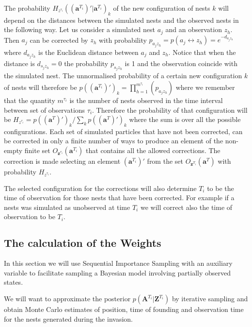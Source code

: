 \documentclass[11pt,a4paper]{article}
\renewcommand{\vec}[1]{\mathbf{#1}}
\begin{document}
{{The probability $H_{z^{\tau_i}}((\vec{a}^{T_i})' | \vec{a}^{T_i})_k$ of the new configuration of nests $k$ will depend on the distances between the simulated nests and the observed nests in the following way. Let us consider a simulated nest $a_j$ and an observation $z_h$. Then $a_j$ can be corrected by $z_h$ with probability $p_{a_j z_h} = p(a_j \leftrightarrow z_h) = e^{-d_{a_j z_h}}$ where $d_{a_j z_h}$ is the Euclidean distance between $a_j$ and $z_h$. Notice that when the distance is $d_{s_j z_h} = 0$ the probability $p_{s_j z_h}$ is 1 and the observation coincide with the simulated nest. The unnormalised probability of a certain new configuration $k$ of nests will therefore be $p((\vec{a}^{T_i})')_k = \prod_{h = 1}^{m^{\tau_i}} (p_{a_j z_h})$ where we remember that the quantity $m^{\tau_i}$ is the number of nests observed in the time interval between set of observations $\tau_i$. Therefore the probability of that configuration will be $H_{z^{\tau_i}} = p((\vec{a}^T)')_k / \sum_k p((\vec{a}^T)')_k $ where the sum is over all the possible configurations. Each set of simulated particles that have not been corrected, can be corrected in only a finite number of ways to produce an element of the non-empty finite set $O_{\vec{z}^{\tau_i}} (\vec{a}^{T_i})$ that contains all the allowed corrections. The correction is made selecting an element $(\vec{a}^{T_i})'$ from the set $O_{\vec{z}^{T_i}} (\vec{a}^T)$ with probability $H_{z^{\tau_i}}$.

The selected configuration for the corrections will also determine $T_i$ to be the time of observation for those nests that have been corrected. For example if a nests was simulated as unobserved at time $T_i$ we will correct also the time of observation to be $T_i$.

}

{\color{red}
\subsection{The calculation of the Weights} \label{subsec:weight}

In this section we will use Sequential Importance Sampling with an auxiliary variable to facilitate sampling a Bayesian model involving partially observed states.

We will want to approximate the posterior $p(\vec{A}^{T_i} | \vec{Z}^{T_i})$ by iterative sampling and obtain Monte Carlo estimates of position, time of founding and observation time for the nests generated during the invasion. 

}}
\end{document}
